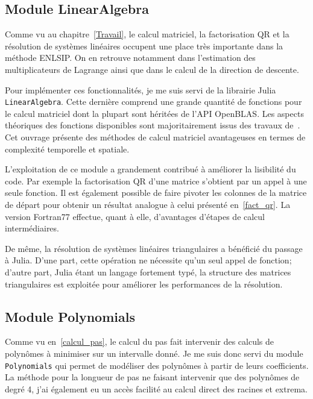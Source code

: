 \subsection*{Module LinearAlgebra}

Comme vu au chapitre~\ref{Travail}, le calcul matriciel, la factorisation QR et la résolution de systèmes linéaires occupent une place très importante dans la méthode ENLSIP.
On en retrouve notamment dans l'estimation des multiplicateurs de Lagrange ainsi que dans le calcul de la direction de descente.

Pour implémenter ces fonctionnalités, je me suis servi de la librairie Julia \texttt{LinearAlgebra}. Cette dernière comprend une grande quantité de fonctions pour le calcul matriciel
dont la plupart sont héritées de l'API OpenBLAS. Les aspects théoriques des fonctions disponibles sont majoritairement issus des travaux de~\citet{goluvanl13}. Cet ouvrage présente des méthodes de calcul matriciel
avantageuses en termes de complexité temporelle et spatiale.

L'exploitation de ce module a grandement contribué à améliorer la lisibilité du code. Par exemple la factorisation QR d'une matrice s'obtient par un appel à une seule
fonction. Il est également possible de faire pivoter les colonnes de la matrice de départ pour obtenir un résultat analogue à celui présenté en~\eqref{fact_qr}.
La version Fortran77 effectue, quant à elle, d'avantages d'étapes de calcul intermédiaires. 

De même, la résolution de systèmes linéaires triangulaires a bénéficié du passage à Julia. D'une part, cette opération ne nécessite qu'un seul appel de fonction;
d'autre part, Julia étant un langage fortement typé, la structure des matrices triangulaires est exploitée pour améliorer les performances de la résolution.



\subsection*{Module Polynomials}

Comme vu en~\ref{calcul_pas}, le calcul du pas fait intervenir des calculs de polynômes à minimiser sur un intervalle donné. Je me suis donc servi du module
\texttt{Polynomials} qui permet de modéliser des polynômes à partir de leurs coefficients. La méthode pour la longueur de pas ne faisant intervenir que des polynômes de degré 4,
j'ai également eu un accès facilité au calcul direct des racines et extrema.

